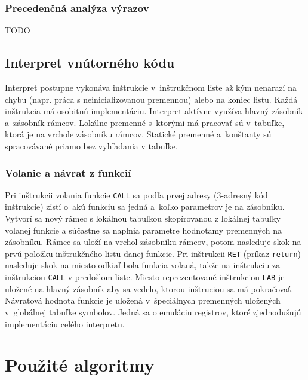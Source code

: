 \documentclass[11pt,a4paper]{article}
\begin{document}
        \subsubsection{Precedenčná analýza výrazov}
        \label{precedencna analyza}
    
    TODO
    
    \subsection{Interpret vnútorného kódu}
    \label{interpret}
    Interpret postupne vykonáva inštrukcie v~inštrukčnom liste až kým nenarazí na chybu (napr. práca s neinicializovanou premennou)
    alebo na koniec listu. Každá inštrukcia má osobitnú implementáciu. Interpret aktívne využíva hlavný zásobník a~zásobník rámcov.
    Lokálne premenné s~ktorými má pracovať  sú v~tabuľke, ktorá je na vrchole zásobníku rámcov. Statické premenné a~konštanty sú spracovávané
    priamo bez vyhľadania v tabuľke.

       \subsubsection{Volanie a návrat z funkcií}
       \label{funkcia}
       Pri inštrukcii volania funkcie \texttt{CALL} sa podľa prvej adresy (3-adresný kód inštrukcie) zistí o~akú funkciu sa jedná
       a~koľko parametrov je na zásobníku.
       Vytvorí sa nový rámec s lokálnou tabuľkou skopírovanou z lokálnej tabuľky volanej funkcie a súčastne sa naplnia parametre
       hodnotamy premenných na zásobníku. Rámec sa uloží na vrchol zásobníku rámcov, potom
       nasleduje skok na prvú položku inštrukčného listu danej funkcie.
       Pri inštrukcii \texttt{RET} (príkaz \texttt{return}) nasleduje skok na miesto odkiaľ bola funkcia volaná, takže na inštrukciu za
       inštrukciou \texttt{CALL} v predošlom liste. Miesto reprezentované inštrukciou \texttt{LAB} je uložené na hlavný zásobník aby sa
       vedelo, ktorou inštruciou sa má pokračovať. Návratová hodnota funkcie je uložená v~špeciálnych premenných uložených v~globálnej
       tabuľke symbolov. Jedná sa o emuláciu registrov, ktoré zjednodušujú implementáciu celého interpretu.

    
    

\section{Použité algoritmy} 
\label{algoritmy}
\end{document}
